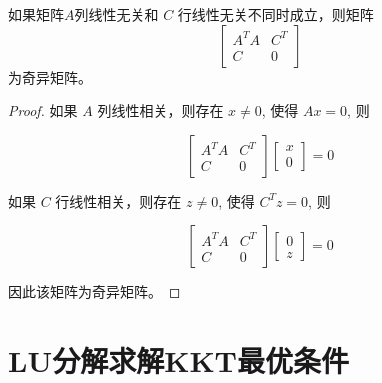 \begin{theorem}
    如果矩阵$A$列线性无关和 $ C $ 行线性无关不同时成立，则矩阵
\begin{equation}
\left[\begin{array}{cc}
A^{T} A & C^{T} \\
{C} & 0
\end{array}\right]
\end{equation}
为奇异矩阵。
\end{theorem}

\begin{proof}
    如果 $ {A} $ 列线性相关，则存在 $ x \neq 0 $, 使得 $ A x=0 $, 则

    \begin{equation}
    \left[\begin{array}{cc}
    A^{T} A & C^{T} \\
    {C} & 0
    \end{array}\right]\left[\begin{array}{l}
    x \\
    0
    \end{array}\right]=0
    \end{equation}

    如果 $ C $ 行线性相关，则存在 $ z \neq 0 $, 使得 $ C^{T} z=0 $, 则

    \begin{equation}
    \left[\begin{array}{cc}
    A^{T} A & C^{T} \\
    {C} & 0
    \end{array}\right]\left[\begin{array}{l}
    0 \\
    {z}
    \end{array}\right]=0
    \end{equation}

    因此该矩阵为奇异矩阵。
\end{proof}


\section{LU分解求解KKT最优条件}

